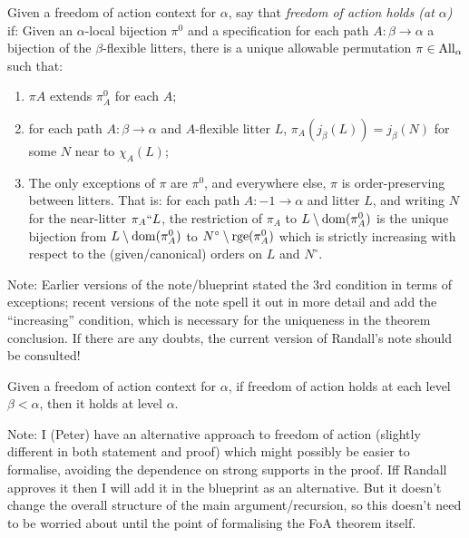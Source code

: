 \begin{definition}
  \label{def:freedom-of-action-statement-old}
  Given a freedom of action context for $\alpha$, say that \emph{freedom of action holds (at $\alpha$)} if: Given an $\alpha$-local bijection $\pi^0$ and a specification for each path $A : \beta \to \alpha$ a bijection of the $\beta$-flexible litters, there is a unique allowable permutation $\pi \in \mathrm{All}_\alpha$ such that:
  \begin{enumerate}
   \item $\pi{A}$ extends $\pi^0_{A}$ for each $A$;
   \item for each path $A : \beta \to \alpha$ and $A$-flexible litter $L$, $\pi_A(j_\beta(L)) = j_\beta(N)$ for some $N$ near to $\chi_A(L)$;
   \item The only exceptions of $\pi$ are $\pi^0$, and everywhere else, $\pi$ is order-preserving between litters.  That is: for each path $A : -1 \to \alpha$ and litter $L$, and writing $N$ for the near-litter $\pi_A``L$, the restriction of $\pi_A$ to $L \setminus \mathrm{dom}(\pi^0_A)$ is the unique bijection from $L \setminus \mathrm{dom}(\pi^0_A)$ to $N^\circ \setminus \mathrm{rge}(\pi^0_A)$ which is strictly increasing with respect to the (given/canonical) orders on $L$ and $N^\circ$.
  \end{enumerate}

  Note: Earlier versions of the note/blueprint stated the 3rd condition in terms of exceptions; recent versions of the note spell it out in more detail and add the “increasing” condition, which is necessary for the uniqueness in the theorem conclusion.  If there are any doubts, the current version of Randall’s note should be consulted!
\end{definition}

\begin{lemma}
\label{lem:freedom-of-action-propagates-old}
Given a freedom of action context for $\alpha$, if freedom of action holds at each level $\beta < \alpha$, then it holds at level $\alpha$.

Note: I (Peter) have an alternative approach to freedom of action (slightly different in both statement and proof) which might possibly be easier to formalise, avoiding the dependence on strong supports in the proof.  Iff Randall approves it then I will add it in the blueprint as an alternative.  But it doesn’t change the overall structure of the main argument/recursion, so this doesn’t need to be worried about until the point of formalising the FoA theorem itself.
\end{lemma}

